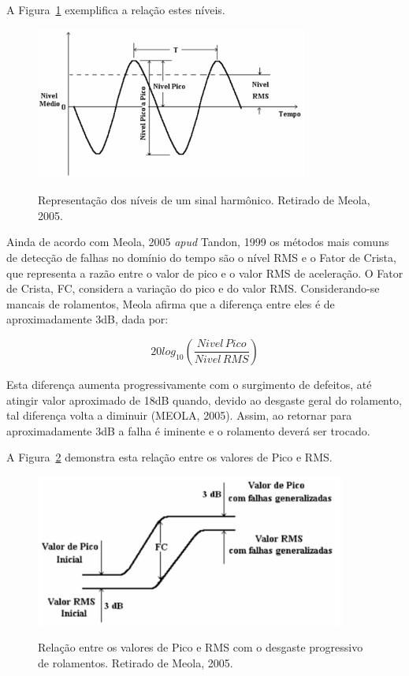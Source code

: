 \documentclass[
	12pt,				
	oneside,			
	a4paper,			
	english,			
	brazil,			
	]{abntex2ppgsi}
\begin{document}
A Figura~\ref{RelacaoSinalHarmonico} exemplifica a relação estes níveis.

\begin{figure}[!htb]
\centering
\caption {Representação dos níveis de um sinal harmônico. Retirado de Meola, 2005.}
\includegraphics[width=\textwidth,height=50mm,keepaspectratio]{Figura17}
\label{RelacaoSinalHarmonico}
\end{figure}

Ainda de acordo com Meola, 2005 \textit{apud} Tandon, 1999 os métodos mais comuns de detecção de falhas no domínio do tempo são o nível RMS e o Fator de Crista, que representa a razão entre o valor de pico e o valor RMS de aceleração. O Fator de Crista, FC, considera a variação do pico e do valor RMS. Considerando-se mancais de rolamentos, Meola afirma que a diferença entre eles é de aproximadamente 3dB, dada por:

\begin{equation}
	20log_{10} \left ( \frac{Nivel \,Pico}{Nivel \, RMS} \right )
	\label{eq: Nível de Pico vs RMS}
\end{equation}

Esta diferença aumenta progressivamente com o surgimento de defeitos, até atingir valor aproximado de 18dB quando, devido ao desgaste geral do rolamento, tal diferença volta a diminuir (MEOLA, 2005). Assim, ao retornar para aproximadamente 3dB a falha é iminente e o rolamento deverá ser trocado. 

A Figura~\ref{RelacaoPicoaPicoeRMS} demonstra esta relação entre os valores de Pico e RMS.  

\begin{figure}[!htb]
\centering
\caption {Relação entre os valores de Pico e RMS com o desgaste progressivo de rolamentos. Retirado de Meola, 2005.}
\includegraphics[width=\textwidth,height=50mm,keepaspectratio]{Figura18}
\label{RelacaoPicoaPicoeRMS}
\end{figure}	
\end{document}
